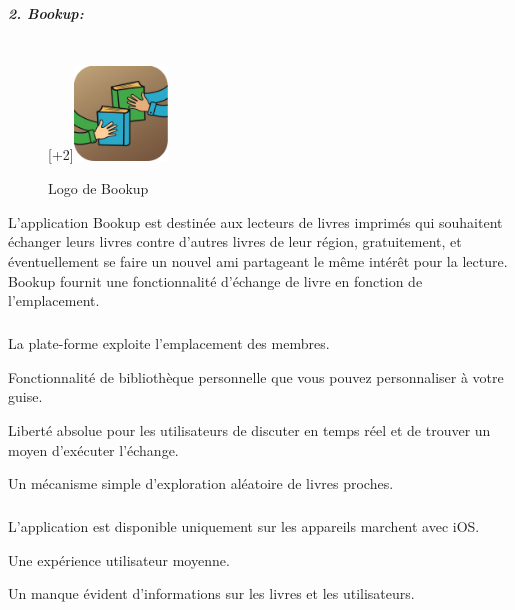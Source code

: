 \subparagraph{{\large 2. Bookup:}\\\\}

\begin{figure}
		\raisebox{0pt}[\dimexpr\height+2\baselineskip\relax]{\includegraphics[width=2.5cm]{Images/chapter1/bookUpLogo.jpg}}
		\caption{Logo de Bookup}
\end{figure}

L'application Bookup est destinée aux lecteurs de livres imprimés qui souhaitent échanger leurs livres contre d'autres livres de leur région, gratuitement, et éventuellement se faire un nouvel ami partageant le même intérêt pour la lecture. Bookup fournit une fonctionnalité d’échange de livre en fonction de l’emplacement.\cite{noauthor_bookup_nodate-1}\\

\subparagraph*{}
\begin{list}{•}{\textbf{Avantages}}
	\item La plate-forme exploite l'emplacement des membres.
	\item Fonctionnalité de bibliothèque personnelle que vous pouvez personnaliser à votre guise.
	\item Liberté absolue pour les utilisateurs de discuter en temps réel et de trouver un moyen d'exécuter l'échange.
	\item Un mécanisme simple d'exploration aléatoire de livres proches.
\end{list}

\subparagraph*{}
\begin{list}{•}{\textbf{Inconvénients}}
	\item L'application est disponible uniquement sur les appareils marchent avec iOS.
	\item Une expérience utilisateur moyenne.
	\item Un manque évident d'informations sur les livres et les utilisateurs.
\end{list}

